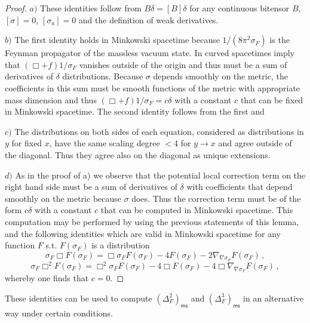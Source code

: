 \documentclass[10pt]{book}
\newcommand{\ms}{\mathsf{ms}}
\theoremstyle{break}
\newtheorem{proof}{Proof}
\begin{document}
\begin{proof}
$a)$ These identities follow from $B\delta=[B]\delta$ for any continuous bitensor $B$, $[\sigma]=0$, $[\sigma_a]=0$ and the definition of weak derivatives.

$b)$ The first identity holds in Minkowski spacetime because $1/(8\pi^2\sigma_F)$ is the Feynman propagator of the massless vacuum state. In curved spacetimes %
imply that $(\Box+f)1/\sigma_F$ vanishes outside of the origin and thus must be a sum of derivatives of $\delta$ distributions. Because $\sigma$ depends smoothly on the metric, the coefficients in this sum must be smooth functions of the metric with appropriate mass dimension and thus $(\Box+f)1/\sigma_F=c\delta$ with a constant $c$ that can be fixed in Minkowski spacetime. The second identity follows from the first and %

$c)$ The distributions on both sides of each equation, considered as distributions in $y$ for fixed $x$, have the same scaling degree $<4$ for $y\to x$ and agree outside of the diagonal. Thus they agree also on the diagonal as unique extensions.

$d)$ As in the proof of a) we observe that the potential local correction term on the right hand side must be a sum of derivatives of $\delta$ with coefficients that depend smoothly on the metric because $\sigma$ does. Thus the correction term must be of the form $c\delta$ with a constant $c$ that can be computed in Minkowski spacetime. This computation may be performed by using %
the previous statements of this lemma, and the following identities which are valid in Minkowski spacetime for any function $F$ s.t. $F(\sigma_F)$ is a distribution
$$\sigma_F\Box  F(\sigma_F)=\Box \sigma_F F(\sigma_F) - 4 F(\sigma_F) - 2\nabla_{\nabla\sigma_F}F(\sigma_F)\,,$$
$$\sigma_F\Box^2  F(\sigma_F)=\Box^2 \sigma_F F(\sigma_F) - 4 \Box F(\sigma_F) - 4\Box \nabla_{\nabla\sigma_F}F(\sigma_F)\,,$$
whereby one finds that $c=0$.
\end{proof}

These identities can be used to compute $\left(\Delta^2_F\right)_\ms$ and $\left(\Delta^3_F\right)_\ms$ in an alternative way under certain conditions.
\end{document}
